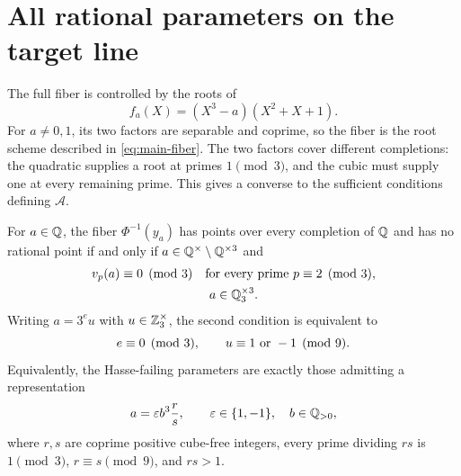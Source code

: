 \section{All rational parameters on the target line}\label{sec:local-global}

The full fiber is controlled by the roots of
\begin{equation}
 f_a(X)=(X^3-a)(X^2+X+1).
 \label{eq:rational-polynomial}
\end{equation}
For \(a\ne0,1\), its two factors are separable and coprime, so the
fiber is the root scheme described in \eqref{eq:main-fiber}.
The two factors cover different completions: the quadratic supplies a
root at primes \(1\pmod3\), and the cubic must supply one at every
remaining prime.  This gives a converse to the sufficient conditions
defining \(\mathcal A\).

\begin{theorem}\label{thm:rational-classification}
For \(a\in\mathbb Q\), the fiber \(\Phi^{-1}(y_a)\) has points over every
completion of \(\mathbb Q\) and has no rational point if and only if
\(a\in\mathbb Q^\times\setminus\mathbb Q^{\times3}\) and
\begin{equation}\label{eq:rational-local}
 \begin{gathered}
 v_p(a)\equiv0\pmod3
       \quad\hbox{for every prime }p\equiv2\pmod3,\\
 a\in\mathbb Q_3^{\times3}.
 \end{gathered}
\end{equation}
Writing \(a=3^e u\) with \(u\in\mathbb Z_3^\times\), the second condition is
equivalent to
\begin{equation}
 e\equiv0\pmod3,\qquad u\equiv1\ \hbox{or }-1\pmod9.
 \label{eq:three-adic-cube}
\end{equation}
Equivalently, the Hasse-failing parameters are exactly those admitting a
representation
\begin{equation}
 a=\varepsilon b^3\frac{r}{s},
 \qquad \varepsilon\in\{1,-1\},\quad b\in\mathbb Q_{>0},
 \label{eq:rational-normal-form}
\end{equation}
where \(r,s\) are coprime positive cube-free integers, every prime
dividing \(rs\) is \(1\pmod3\), \(r\equiv s\pmod9\), and \(rs>1\).
\end{theorem}

